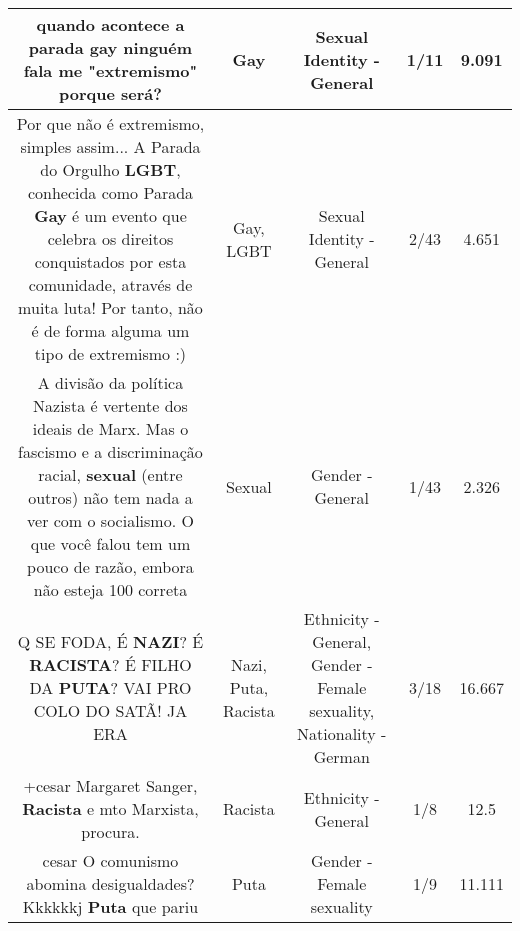 \documentclass[11pt]{article}
\newlength\mylength
\begin{document}
\begin{center}
\begin{longtable}{|C{.65\mylength}|C{.30\mylength}|C{.12\mylength}|C{.12\mylength}|C{.12\mylength}|}
  \small quando acontece a parada \textbf{gay} ninguém fala me "extremismo" porque será?\normalsize   & Gay & Sexual Identity - General & 1/11 & 9.091 \\  \hline
  \small Por que não é extremismo, simples assim... A Parada do Orgulho \textbf{LGBT}, conhecida como Parada \textbf{Gay} é um evento que celebra os direitos conquistados por esta comunidade, através de muita luta! Por tanto, não é de forma alguma um tipo de extremismo :)\normalsize   & Gay, LGBT & Sexual Identity - General & 2/43 & 4.651 \\  \hline
  \small A divisão da política Nazista é vertente dos ideais de Marx. Mas o fascismo e a discriminação racial, \textbf{sexual} (entre outros) não tem nada a ver com o socialismo. O que você falou tem um pouco de razão, embora não esteja 100 correta\normalsize   & Sexual & Gender - General & 1/43 & 2.326 \\  \hline
  \small Q SE FODA, É \textbf{NAZI}? É \textbf{RACISTA}? É FILHO DA \textbf{PUTA}? VAI PRO COLO DO SATÃ! JA ERA\normalsize   & Nazi, Puta, Racista & Ethnicity - General, Gender - Female sexuality, Nationality - German & 3/18 & 16.667 \\  \hline
  \small +cesar Margaret Sanger, \textbf{Racista} e mto Marxista, procura.\normalsize   & Racista & Ethnicity - General & 1/8 & 12.5 \\  \hline
  \small cesar O comunismo abomina desigualdades? Kkkkkkj \textbf{Puta} que pariu\normalsize   & Puta & Gender - Female sexuality & 1/9 & 11.111 \\  \hline

\end{longtable}
\end{center}
\end{document}
